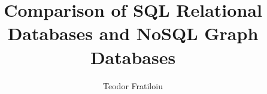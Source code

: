 \documentclass[10pt,        %
               a4paper,     %
               journal,     %
               ]{IEEEtran}
\makeatletter
\def\markboth#1#2{\def\leftmark{\@IEEEcompsoconly{\sffamily}\MakeUppercase{\protect#1}}%
\def\rightmark{\@IEEEcompsoconly{\sffamily}\MakeUppercase{\protect#2}}}
\makeatother
\begin{document}
\title{Comparison of SQL Relational Databases and NoSQL Graph Databases}


\author{Teodor Fratiloiu}%

% 
%

\markboth{Scientific Seminar on Security in Information Technology, Winter Semester 2020/2021}%
{Teodor Fratiloiu: Comparison of SQL Relational Databases and NoSQL Graph Databases}

% 
\end{document}
